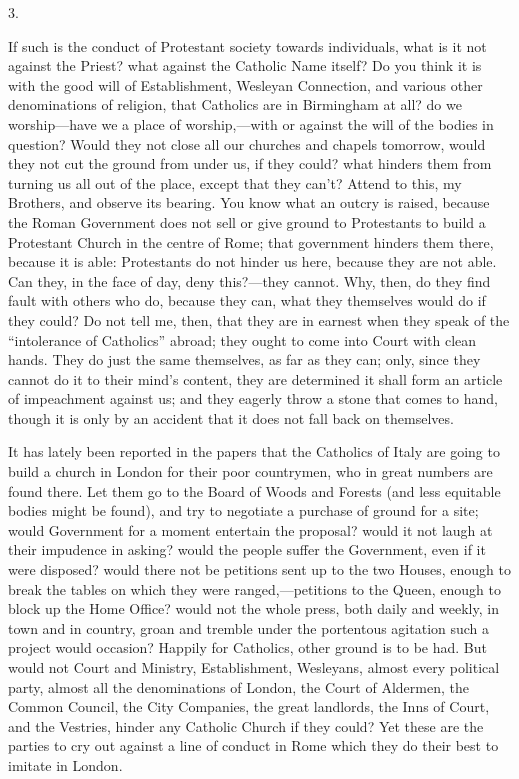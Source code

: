 3.

If such is the conduct of Protestant society towards
individuals, what is it not against the Priest? what
against the Catholic Name itself? Do you think it is with
the good will of Establishment, Wesleyan Connection, and
various other denominations of religion, that Catholics
are in Birmingham at all? do we worship—have we a
place of worship,—with or against the will of the
bodies in question? Would they not close all our churches
and chapels tomorrow, would they not cut the ground from
under us, if they could? what hinders them from turning
us all out of the place, except that they can't? Attend
to this, my Brothers, and observe its bearing. You know
what an outcry is raised, because the Roman Government
does not sell or give ground to Protestants to build a
Protestant Church in the centre of Rome; that government
hinders them there, because it is able: Protestants do
not hinder us here, because they are not able. Can they,
in the face of day, deny this?—they cannot. Why,
then, do they find fault with others who do, because they
can, what they themselves would do if they could? Do not
tell me, then, that they are in earnest when they speak
of the ``intolerance of Catholics'' abroad; they
ought to come into Court with clean hands. They do just
the same themselves, as far as they can; only, since they
cannot do it to their mind's content, they are determined
it shall form an article of impeachment against us; and
they eagerly throw a stone that comes to hand, though it
is only by an accident that it does not fall back on
themselves.

It has lately been reported in the papers that the
Catholics of Italy are going to build a church in London
for their poor countrymen, who in great numbers are found
there. Let them go to the Board of Woods and Forests (and
less equitable bodies might be found), and try to
negotiate a purchase of ground for a site; would
Government for a moment entertain the proposal? would it
not laugh at their impudence in asking? would the people
suffer the Government, even if it were disposed? would
there not be petitions sent up to the two Houses, enough
to break the tables on which they were ranged,—petitions
to the Queen, enough to block up the Home Office? would
not the whole press, both daily and weekly, in town and
in country, groan and tremble under the portentous
agitation such a project would occasion? Happily for
Catholics, other ground is to be had. But would not Court
and Ministry, Establishment, Wesleyans, almost every
political party, almost all the denominations of London,
the Court of Aldermen, the Common Council, the City
Companies, the great landlords, the Inns of Court, and
the Vestries, hinder any Catholic Church if they could?
Yet these are the parties to cry out against a line of
conduct in Rome which they do their best to imitate in
London.

